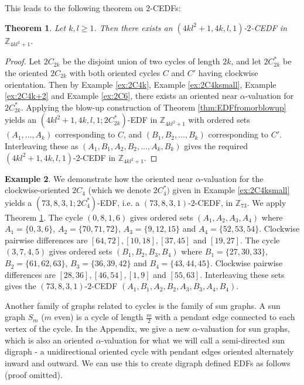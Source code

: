 \documentclass[12pt, a4paper]{article}
\newtheorem{theorem}{Theorem}[section]
\theoremstyle{definition}
\newtheorem{example}[theorem]{Example}
\begin{document}
This leads to the following theorem on $2$-CEDFs:
\begin{theorem}\label{thm:2CEDF}
Let $k,l \geq 1$.  Then there exists an $(4kl^2+1,4k,l,1)$-$2$-CEDF in $\mathbb{Z}_{4kl^2+1}$.
\end{theorem}
\begin{proof}
Let $2C_{2k}$ be the disjoint union of two cycles of length $2k$, and let $2C_{2k}^*$ be the oriented $2C_{2k}$ with both oriented cycles $C$ and $C'$  having clockwise orientation. Then by Example \ref{ex:2C4k}, Example \ref{ex:2C4ksmall}, Example \ref{ex:2C4k+2} and Example \ref{ex:2C6}, there exists an oriented near $\alpha$-valuation for $2C_{2k}^*$.  Applying the blow-up construction of Theorem \ref{thm:EDFfromorblowup} yields an $(4kl^2 +1,4k,l,1;2C_{2k}^*)$-EDF in $\mathbb{Z}_{4kl^2+1}$ with ordered sets $(A_1,\ldots,A_k)$ corresponding to $C$, and $(B_1,B_2,\ldots,B_k)$ corresponding to $C'$.  Interleaving these as $(A_1,B_1,A_2,B_2,\ldots,A_k,B_k)$ gives the required $(4kl^2+1,4k,l,1)$-$2$-CEDF in $\mathbb{Z}_{4kl^2+1}$.
\end{proof}

\begin{example}
We demonstrate how the oriented near $\alpha$-valuation for the clockwise-oriented $2C_4$ (which we denote $2C_4^*)$ given in Example \ref{ex:2C4ksmall} yields a $(73,8,3,1;2C_4^*)$-EDF, i.e. a $(73,8,3,1)$-$2$-CEDF, in $\mathbb{Z}_{73}$.  We apply Theorem \ref{thm:2CEDF}.  The cycle $(0,8,1,6)$ gives ordered sets $(A_1,A_2,A_3,A_4)$ where
$A_1=\{0,3,6\}$, $A_2=\{70,71,72\}$, $A_3=\{9,12,15\}$ and $A_4=\{52,53,54\}$. Clockwise pairwise differences are $[64,72], [10,18], [37,45]$ and $[19,27]$. The cycle $(3,7,4,5)$ gives ordered sets $(B_1,B_2,B_3,B_4)$ where
$B_1=\{27,30,33\}$, $B_2=\{61,62,63\}$, $B_3= \{36,39,42\}$ and $B_4=\{43,44,45\}$. Clockwise pairwise differences are $[28,36],[46,54],[1,9]$ and $[55,63]$.  Interleaving these sets gives the $(73,8,3,1)$-$2$-CEDF $(A_1,B_1,A_2,B_2,A_3,B_3,A_4,B_4)$.
\end{example}

Another family of graphs related to cycles is the family of sun graphs.  A sun graph $S_m$ ($m$ even) is a cycle of length $\frac{m}{2}$ with a pendant edge connected to each vertex of the cycle.  In the Appendix, we give a new $\alpha$-valuation for sun graphs, which is also an oriented $\alpha$-valuation for what we will call a semi-directed sun digraph - a unidirectional oriented cycle with pendant edges oriented alternately inward and outward. We can use this to create digraph defined EDFs as follows (proof omitted).
\end{document}
